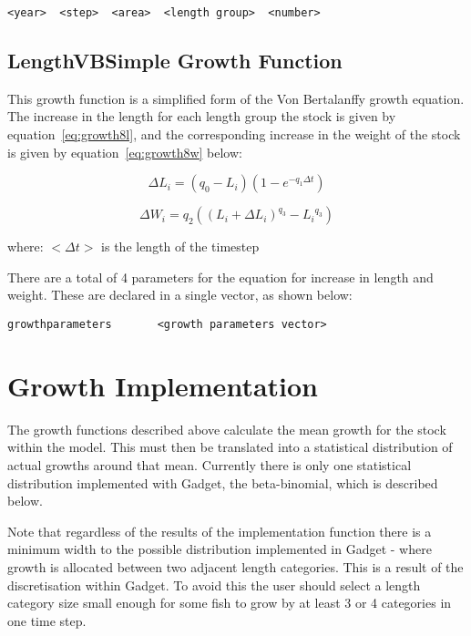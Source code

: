 \documentclass [a4paper, 10pt]{book}
\begin{document}
{\small\begin{verbatim}
<year>  <step>  <area>  <length group>  <number>
\end{verbatim}}

\subsection{LengthVBSimple Growth Function}\label{subsec:growth8}
This growth function is a simplified form of the Von Bertalanffy growth equation.  The increase in the length for each length group the stock is given by equation~\ref{eq:growth8l}, and the corresponding increase in the weight of the stock is given by equation~\ref{eq:growth8w} below:

\begin{equation}\label{eq:growth8l}
\Delta L_{i} = \left( q_{0} - L_{i} \right) \left( 1 - e^{-q_{1} \Delta t} \right)
\end{equation}

\begin{equation}\label{eq:growth8w}
\Delta W_{i} = q_{2} \left( \left( L_{i} + \Delta L_{i} \right) ^{q_{3}} - {L_{i}}^{q_{3}} \right)
\end{equation}

where:\newline
$<\Delta t>$ is the length of the timestep

\bigskip
There are a total of 4 parameters for the equation for increase in length and weight.  These are declared in a single vector, as shown below:

{\small\begin{verbatim}
growthparameters       <growth parameters vector>
\end{verbatim}}

\section{Growth Implementation}\label{subsec:stockgrowthimplement}
The growth functions described above calculate the mean growth for the stock within the model. This must then be translated into a statistical distribution of actual growths around that mean.  Currently there is only one statistical distribution implemented with Gadget, the beta-binomial, which is described below.

\bigskip
Note that regardless of the results of the implementation function there is a minimum width to the possible distribution implemented in Gadget - where growth is allocated between two adjacent length categories.  This is a result of the discretisation within Gadget.  To avoid this the user should select a length category size small enough for some fish to grow by at least 3 or 4 categories in one time step.
\end{document}
